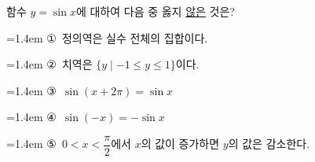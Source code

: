 함수 $y=\sin x$에 대하여 다음 중 옳지 \underline{않은} 것은?
\par\medskip\par\noindent\hangindent=1.4em {\small ①}\ 정의역은 실수 전체의 집합이다.\par\noindent\hangindent=1.4em {\small ②}\ 치역은 $\{y \mid -1\le y\le 1\}$이다.\par\noindent\hangindent=1.4em {\small ③}\ $\sin (x+2\pi)=\sin x$\par\noindent\hangindent=1.4em {\small ④}\ $\sin (-x)=-\sin x$\par\noindent\hangindent=1.4em {\small ⑤}\ $0<x<\dfrac{\pi}{2}$에서 $x$의 값이 증가하면 $y$의 값은 감소한다.\par\medskip
